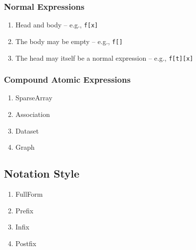 \documentclass[11pt]{article}
\theoremstyle{definition}
\begin{document}
\subsubsection{Normal Expressions}
\begin{enumerate}
\item Head and body -- e.g., \verb|f[x]|
\item The body may be empty -- e.g., \verb|f[]|
\item The head may itself be a normal expression -- e.g., \verb|f[t][x]|
\end{enumerate}

\subsubsection{Compound Atomic Expressions}

\begin{enumerate}
\item SparseArray
\item Association
\item Dataset
\item Graph
\end{enumerate}

\subsection{Notation Style}
\begin{enumerate}
\item FullForm
\item Prefix
\item Infix
\item Postfix
\end{enumerate}
\end{document}
